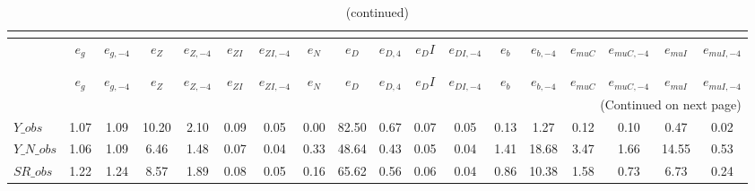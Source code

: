  
\begin{center}
\begin{longtable}{lccccccccccccccccc} 
\caption{VARIANCE DECOMPOSITION (in percent)}\\
 \label{Table:th_var_decomp_uncond}\\
\toprule 
$               $	 & 	 $           {e_g}$	 & 	 $      {e_{g,-4}}$	 & 	 $           {e_Z}$	 & 	 $      {e_{Z,-4}}$	 & 	 $        {e_{ZI}}$	 & 	 $     {e_{ZI,-4}}$	 & 	 $           {e_N}$	 & 	 $           {e_D}$	 & 	 $       {e_{D,4}}$	 & 	 $          {e_DI}$	 & 	 $     {e_{DI,-4}}$	 & 	 $           {e_b}$	 & 	 $      {e_{b,-4}}$	 & 	 $       {e_{muC}}$	 & 	 $    {e_{muC,-4}}$	 & 	 $       {e_{muI}}$	 & 	 $    {e_{muI,-4}}$\\
\midrule \endfirsthead 
\caption{(continued)}\\
 \toprule \\ 
$               $	 & 	 $           {e_g}$	 & 	 $      {e_{g,-4}}$	 & 	 $           {e_Z}$	 & 	 $      {e_{Z,-4}}$	 & 	 $        {e_{ZI}}$	 & 	 $     {e_{ZI,-4}}$	 & 	 $           {e_N}$	 & 	 $           {e_D}$	 & 	 $       {e_{D,4}}$	 & 	 $          {e_DI}$	 & 	 $     {e_{DI,-4}}$	 & 	 $           {e_b}$	 & 	 $      {e_{b,-4}}$	 & 	 $       {e_{muC}}$	 & 	 $    {e_{muC,-4}}$	 & 	 $       {e_{muI}}$	 & 	 $    {e_{muI,-4}}$\\
\midrule \endhead 
\midrule \multicolumn{18}{r}{(Continued on next page)} \\ \bottomrule \endfoot 
\bottomrule \endlastfoot 
$Y\_obs         $	 & 	            1.07	 & 	            1.09	 & 	           10.20	 & 	            2.10	 & 	            0.09	 & 	            0.05	 & 	            0.00	 & 	           82.50	 & 	            0.67	 & 	            0.07	 & 	            0.05	 & 	            0.13	 & 	            1.27	 & 	            0.12	 & 	            0.10	 & 	            0.47	 & 	            0.02 \\ 
$Y\_N\_obs      $	 & 	            1.06	 & 	            1.09	 & 	            6.46	 & 	            1.48	 & 	            0.07	 & 	            0.04	 & 	            0.33	 & 	           48.64	 & 	            0.43	 & 	            0.05	 & 	            0.04	 & 	            1.41	 & 	           18.68	 & 	            3.47	 & 	            1.66	 & 	           14.55	 & 	            0.53 \\ 
$SR\_obs        $	 & 	            1.22	 & 	            1.24	 & 	            8.57	 & 	            1.89	 & 	            0.08	 & 	            0.05	 & 	            0.16	 & 	           65.62	 & 	            0.56	 & 	            0.06	 & 	            0.04	 & 	            0.86	 & 	           10.38	 & 	            1.58	 & 	            0.73	 & 	            6.73	 & 	            0.24 \\ 

\end{longtable}
\end{center}
